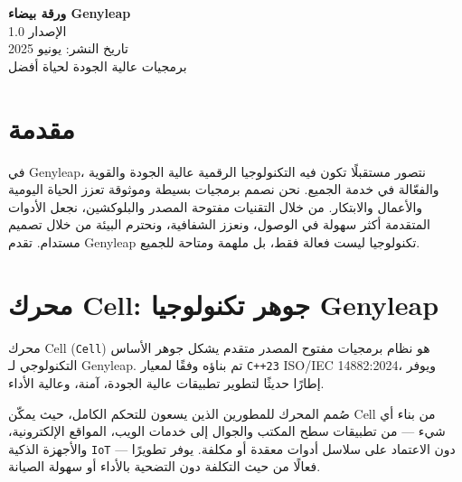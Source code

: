 \documentclass[a4paper,12pt,openany]{book}
\begin{document}
\begin{titlepage}
    \begin{center}
        \vspace*{1.5cm}
        {\Huge \textbf{ورقة بيضاء Genyleap}} \\
        \vspace{0.5cm}
        {\Large الإصدار 1.0} \\
        \vspace{0.5cm}
        {\large تاريخ النشر: يونيو 2025} \\
        \vspace{1.5cm}
        {\large برمجيات عالية الجودة لحياة أفضل} \\
    \end{center}
    \vfill
\end{titlepage}

\chapter{مقدمة}
في Genyleap، نتصور مستقبلًا تكون فيه التكنولوجيا الرقمية عالية الجودة والقوية والفعّالة في خدمة الجميع. نحن نصمم برمجيات بسيطة وموثوقة تعزز الحياة اليومية والأعمال والابتكار. من خلال التقنيات مفتوحة المصدر والبلوكشين، نجعل الأدوات المتقدمة أكثر سهولة في الوصول، ونعزز الشفافية، ونحترم البيئة من خلال تصميم مستدام. تقدم Genyleap تكنولوجيا ليست فعالة فقط، بل ملهمة ومتاحة للجميع.

\chapter{محرك Cell: جوهر تكنولوجيا Genyleap}

محرك Cell (\texttt{Cell}) هو نظام برمجيات مفتوح المصدر متقدم يشكل جوهر الأساس التكنولوجي لـ Genyleap. تم بناؤه وفقًا لمعيار \texttt{C++23} ISO/IEC 14882:2024، ويوفر إطارًا حديثًا لتطوير تطبيقات عالية الجودة، آمنة، وعالية الأداء.

صُمم المحرك للمطورين الذين يسعون للتحكم الكامل، حيث يمكّن Cell من بناء أي شيء — من تطبيقات سطح المكتب والجوال إلى خدمات الويب، المواقع الإلكترونية، والأجهزة الذكية \texttt{IoT} — دون الاعتماد على سلاسل أدوات معقدة أو مكلفة. يوفر تطويرًا فعالًا من حيث التكلفة دون التضحية بالأداء أو سهولة الصيانة.
\end{document}
